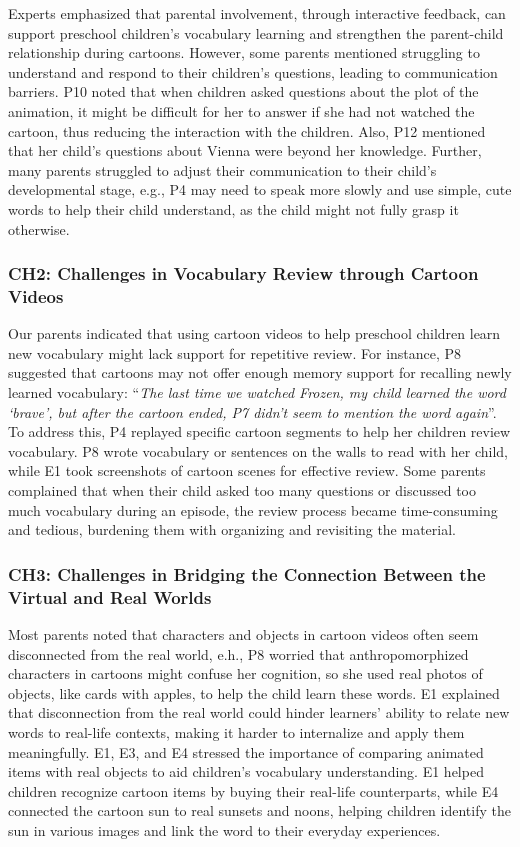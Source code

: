 Experts emphasized that parental involvement, through interactive feedback, can support preschool children's vocabulary learning and strengthen the parent-child relationship during cartoons. 
However, some parents mentioned struggling to understand and respond to their children's questions, leading to communication barriers. P10 noted that when children asked questions about the plot of the animation,  it might be difficult for her to answer if she had not watched the cartoon, thus reducing the interaction with the children. Also, P12 mentioned that her child's questions about Vienna were beyond her knowledge.
Further, many parents struggled to adjust their communication to their child's developmental stage, e.g., P4 may need to speak more slowly and use simple, cute words to help their child understand, as the child might not fully grasp it otherwise. 
 

\subsubsection{CH2: Challenges in Vocabulary Review through Cartoon Videos}
Our parents indicated that using cartoon videos to help preschool children learn new vocabulary might lack support for repetitive review. 
For instance, P8 suggested that cartoons may not offer enough memory support for recalling newly learned vocabulary: ``\textit{The last time we watched Frozen, my child learned the word `brave', but after the cartoon ended, P7 didn't seem to mention the word again}''.
To address this, P4 replayed specific cartoon segments to help her children review vocabulary. P8 wrote vocabulary or sentences on the walls to read with her child, while E1 took screenshots of cartoon scenes for effective review.
Some parents complained that when their child asked too many questions or discussed too much vocabulary during an episode, the review process became time-consuming and tedious, burdening them with organizing and revisiting the material.

\subsubsection{CH3: Challenges in Bridging the Connection Between the Virtual and Real Worlds}
Most parents noted that characters and objects in cartoon videos often seem disconnected from the real world, e.h., P8 worried that anthropomorphized characters in cartoons might confuse her cognition, so she used real photos of objects, like cards with apples, to help the child learn these words.
E1 explained that disconnection from the real world could hinder learners' ability to relate new words to real-life contexts, making it harder to internalize and apply them meaningfully.
E1, E3, and E4 stressed the importance of comparing animated items with real objects to aid children's vocabulary understanding. E1 helped children recognize cartoon items by buying their real-life counterparts, while E4 connected the cartoon sun to real sunsets and noons, helping children identify the sun in various images and link the word to their everyday experiences.

